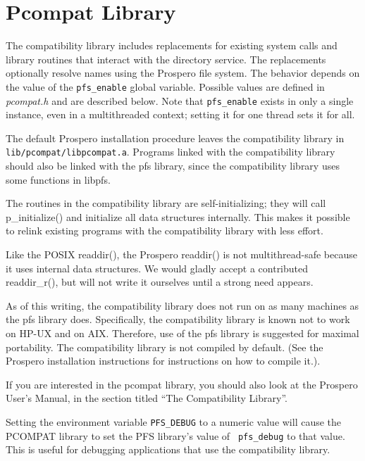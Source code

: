 \section{Pcompat Library}

The compatibility library includes replacements for existing system
calls and library routines that interact with the directory service.
The replacements optionally resolve names using the Prospero file
system.  The behavior depends on the value of the {\tt pfs\_enable}
global variable.  Possible values are defined in {\it pcompat.h} and
are described below.  Note that {\tt pfs\_enable} exists in only a
single instance, even in a multithreaded context; setting it for one
thread sets it for all.

\begin{sloppypar}
The default Prospero installation procedure leaves the compatibility
library in {\tt lib/pcompat/libpcompat.a}.  Programs linked with the
compatibility library should also be linked with the pfs library,
since the compatibility library uses some functions in libpfs.
\end{sloppypar}

The routines in the compatibility library are self-initializing; they
will call p\_initialize() and initialize all data structures
internally.  This makes it possible to relink existing programs with
the compatibility library with less effort.

Like the POSIX readdir(), the Prospero readdir() is not
multithread-safe because it uses internal data structures.  We would
gladly accept a contributed readdir\_r(), but will not write it
ourselves until a strong need appears.

As of this writing, the compatibility library does not run on as many
machines as the pfs library does.  Specifically, the compatibility
library is known not to work on {\sc HP-UX} and on {\sc AIX}.
Therefore, use of the pfs library is suggested for maximal
portability.  The compatibility library is not compiled by default.
(See the Prospero installation instructions for instructions on how to
compile it.).

If you are interested in the pcompat library, you should also look at
the Prospero User's Manual, in the section titled ``The Compatibility
Library''.

Setting the environment variable {\tt PFS\_DEBUG} to a numeric value will
cause the PCOMPAT library to set the PFS library's value of {\tt
pfs\_debug} to that value.  This is useful for debugging applications
that use the compatibility library.

